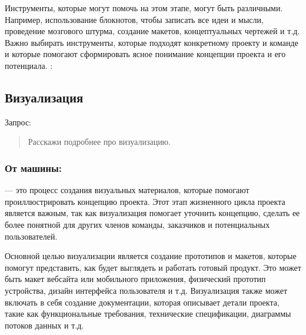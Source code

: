 \documentclass[letterpaper,10pt,russian]{sphinxmanual}
\begin{document}
\sphinxAtStartPar
Инструменты, которые могут помочь на этом этапе, могут быть различными. Например, использование блокнотов, чтобы записать все идеи и мысли, проведение мозгового штурма, создание макетов, концептуальных чертежей и т.д. Важно выбирать инструменты, которые подходят конкретному проекту и команде и которые помогают сформировать ясное понимание концепции проекта и его потенциала. : 


\subsection{Визуализация}
\label{\detokenize{educational_materials/stages/content:id7}}
\sphinxAtStartPar
Запрос:
\begin{quote}

\sphinxAtStartPar
Расскажи подробнее про визуализацию.
\end{quote}


\subsubsection{От машины:}
\label{\detokenize{educational_materials/stages/content:id8}}
\sphinxAtStartPar
{} — это процесс создания визуальных материалов, которые помогают проиллюстрировать концепцию проекта. Этот этап жизненного цикла проекта является важным, так как визуализация помогает уточнить концепцию, сделать ее более понятной для других членов команды, заказчиков и потенциальных пользователей.

\sphinxAtStartPar
Основной целью визуализации является создание прототипов и макетов, которые помогут представить, как будет выглядеть и работать готовый продукт. Это может быть макет веб\sphinxhyphen{}сайта или мобильного приложения, физический прототип устройства, дизайн интерфейса пользователя и т.д. Визуализация также может включать в себя создание документации, которая описывает детали проекта, такие как функциональные требования, технические спецификации, диаграммы потоков данных и т.д.
\end{document}
